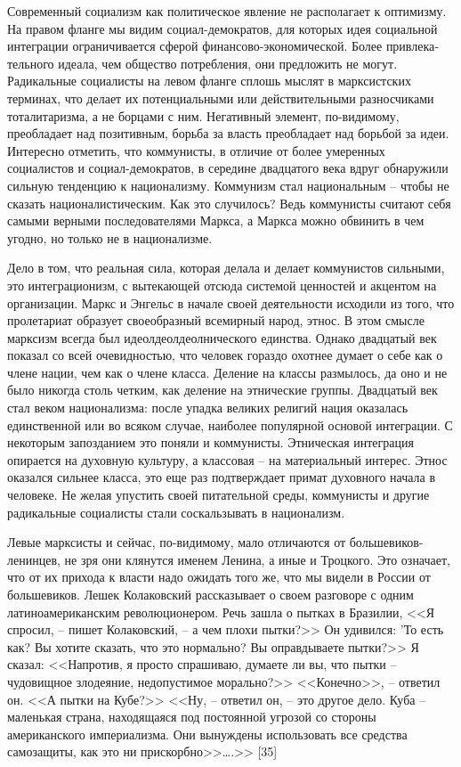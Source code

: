 \documentclass{book}
\begin{document}
Современный социализм как политическое явление не рас­полагает к оптимизму. На правом фланге мы видим социал-демократов, для которых идея социальной интеграции ограни­чивается сферой финансово-экономической. Более привлека­тельного идеала, чем общество потребления, они предложить не могут. Радикальные социалисты на левом фланге сплошь мыс­лят в марксистских терминах, что делает их потенциальными или действительными разносчиками тоталитаризма, а не борца­ми с ним. Негативный элемент, по-видимому, преобладает над позитивным, борьба за власть преобладает над борьбой за идеи.
Интересно отметить, что коммунисты, в отличие от более умеренных социалистов и социал-демократов, в середине двад­цатого века вдруг обнаружили сильную тенденцию к национа­лизму. Коммунизм стал национальным -- чтобы не сказать на­ционалистическим. Как это случилось? Ведь коммунисты счита­ют себя самыми верными последователями Маркса, а Маркса можно обвинить в чем угодно, но только не в национализме.

Дело в том, что реальная сила, которая делала и делает ком­мунистов сильными, это интеграционизм, с вытекающей отсю­да системой ценностей и акцентом на организации. Маркс и Эн­гельс в начале своей деятельности исходили из того, что проле­тариат образует своеобразный всемирный народ, этнос. В этом смысле марксизм всегда был идеолдеолдеолнического единства. Однако двадцатый век показал со всей очевидностью, что чело­век гораздо охотнее думает о себе как о члене нации, чем как о члене класса. Деление на классы размылось, да оно и не было никогда столь четким, как деление на этнические группы. Двадцатый век стал веком национализма: после упадка великих религий нация оказалась единственной или во всяком случае, наиболее популярной основой интеграции. С некоторым за­позданием это поняли и коммунисты. Этническая интеграция опирается на духовную культуру, а классовая -- на материаль­ный интерес. Этнос оказался сильнее класса, это еще раз подт­верждает примат духовного начала в человеке. Не желая упу­стить своей 
питательной среды, коммунисты и другие радикаль­ные социалисты стали соскальзывать в национализм.

Левые марксисты и сейчас, по-видимому, мало отличаются от большевиков-ленинцев, не зря они клянутся именем Ленина, а иные и Троцкого. Это означает, что от их прихода к власти надо ожидать того же, что мы видели в России от большевиков. Лешек Колаковский рассказывает о своем разговоре с одним латиноамериканским революционером. Речь зашла о пытках в Бразилии, <<Я спросил, -- пишет Колаковский, -- а чем плохи пытки?>> Он удивился: 'То есть как? Вы хотите сказать, что это нормально? Вы оправдываете пытки?>> Я сказал: <<Напротив, я просто спрашиваю, думаете ли вы, что пытки -- чудовищное зло­деяние, недопустимое морально?>> <<Конечно>>, -- ответил он. <<А пытки на Кубе?>> <<Ну, -- ответил он, -- это другое дело. Ку­ба -- маленькая страна, находящаяся под постоянной угрозой со стороны американского империализма. Они вынуждены использовать все средства самозащиты, как это ни прискорб­но>>\ldots.>> [35]
\end{document}
